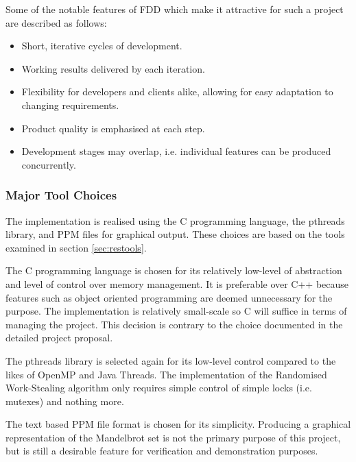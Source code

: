 

Some of the notable features of FDD which make it attractive for such a project are described 
as follows:

\begin{itemize}
\item Short, iterative cycles of development.
\item Working results delivered by each iteration.
\item Flexibility for developers and clients alike, allowing for easy adaptation to changing requirements.
\item Product quality is emphasised at each step. 
\item Development stages may overlap, i.e. individual features can be produced concurrently.
\end{itemize}


\subsubsection*{Major Tool Choices}

The implementation is realised using the C programming language, the pthreads library, and PPM files for graphical output.
These choices are based on the tools examined in section \ref{sec:restools}.

The C programming language is chosen for its relatively low-level of abstraction and level of control over memory management.
It is preferable over C++ because features such as object oriented programming are deemed unnecessary for the purpose. 
The implementation is relatively small-scale so C will suffice in terms of managing the project.
This decision is contrary to the choice documented in the detailed project proposal. 

The pthreads library is selected again for its low-level control compared to the likes of OpenMP and Java Threads.
The implementation of the Randomised Work-Stealing algorithm only requires simple control of simple locks (i.e. mutexes)
and nothing more. 

The text based PPM file format is chosen for its simplicity. Producing a graphical representation of the Mandelbrot set is not
the primary purpose of this project, but is still a desirable feature for verification and demonstration purposes.

